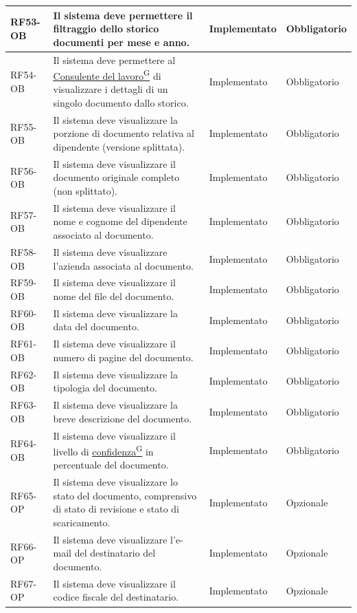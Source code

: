 \documentclass[a4paper,12pt]{article}
\providecommand{\glslink}[2]{\href{https://alittlebyte-19.github.io/Documentazione/glossario.html\#gls-#1}{\underline{#2}\textsuperscript{\scriptsize G}}}
\begin{document}
\begin{sloppypar}
{\begin{longtable}{|p{1.8cm}|p{8.7cm}|p{2.4cm}|p{2.1cm}|}
    \hline
    RF53-OB & Il sistema deve permettere il filtraggio dello storico documenti per mese e anno. & Implementato & Obbligatorio \\
    \hline
    RF54-OB & Il sistema deve permettere al \glslink{consulente-del-lavoro-cdl}{Consulente del lavoro} di visualizzare i dettagli di un singolo documento dallo storico. & Implementato & Obbligatorio \\
    \hline
    RF55-OB & Il sistema deve visualizzare la porzione di documento relativa al dipendente (versione splittata). & Implementato & Obbligatorio \\
    \hline
    RF56-OB & Il sistema deve visualizzare il documento originale completo (non splittato). & Implementato & Obbligatorio \\
    \hline
    RF57-OB & Il sistema deve visualizzare il nome e cognome del dipendente associato al documento. & Implementato & Obbligatorio \\
    \hline
    RF58-OB & Il sistema deve visualizzare l'azienda associata al documento. & Implementato & Obbligatorio \\
    \hline
    RF59-OB & Il sistema deve visualizzare il nome del file del documento. & Implementato & Obbligatorio \\
    \hline
    RF60-OB & Il sistema deve visualizzare la data del documento. & Implementato & Obbligatorio \\
    \hline
    RF61-OB & Il sistema deve visualizzare il numero di pagine del documento. & Implementato & Obbligatorio \\
    \hline
    RF62-OB & Il sistema deve visualizzare la tipologia del documento. & Implementato & Obbligatorio \\
    \hline
    RF63-OB & Il sistema deve visualizzare la breve descrizione del documento. & Implementato & Obbligatorio \\
    \hline
    RF64-OB & Il sistema deve visualizzare il livello di \glslink{confidenza-confidence-score}{confidenza} in percentuale del documento. & Implementato & Obbligatorio \\
    \hline
    RF65-OP & Il sistema deve visualizzare lo stato del documento, comprensivo di stato di revisione e stato di scaricamento. & Implementato & Opzionale \\
    \hline
    RF66-OP & Il sistema deve visualizzare l'e-mail del destinatario del documento. & Implementato & Opzionale \\
    \hline
    RF67-OP & Il sistema deve visualizzare il codice fiscale del destinatario. & Implementato & Opzionale \\

\end{longtable}}
\end{sloppypar}
\end{document}
